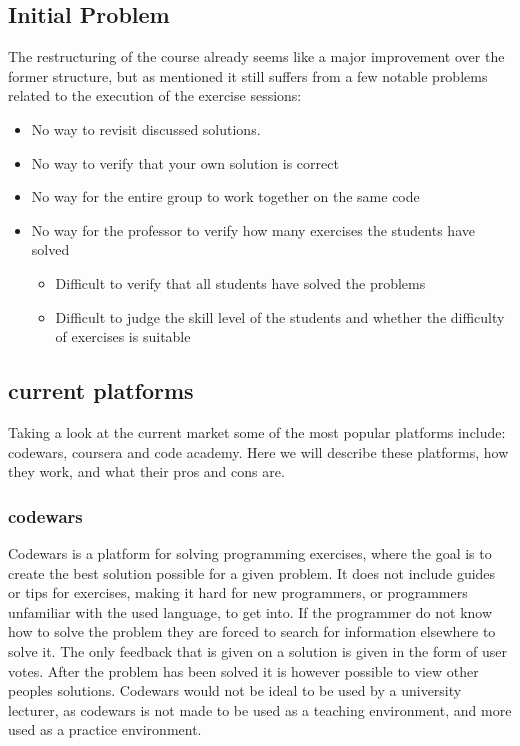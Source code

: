 \subsection{Initial Problem} \label{sec:initial-problem}
The restructuring of the course already seems like a major improvement over the former structure, but as mentioned it still suffers from a few notable problems related to the execution of the exercise sessions:
\begin{itemize}
	\item No way to revisit discussed solutions.
	\item No way to verify that your own solution is correct
	\item No way for the entire group to work together on the same code
	\item No way for the professor to verify how many exercises the students have solved
	\begin{itemize}
		\item Difficult to verify that all students have solved the problems
		\item Difficult to judge the skill level of the students and whether the difficulty of exercises is suitable
	\end{itemize}
\end{itemize}

\subsection{current platforms}
Taking a look at the current market some of the most popular platforms include: codewars, coursera and code academy.
Here we will describe these platforms, how they work, and what their pros and cons are.

\subsubsection*{codewars}
Codewars is a platform for solving programming exercises, where the goal is to create the best solution possible for a given problem. It does not include guides or tips for exercises, making it hard for new programmers, or programmers unfamiliar with the used language, to get into. If the programmer do not know how to solve the problem they are forced to search for information elsewhere to solve it. The only feedback that is given on a solution is given in the form of user votes. After the problem has been solved it is however possible to view other peoples solutions. 
Codewars would not be ideal to be used by a university lecturer, as codewars is not made to be used as a teaching environment, and more used as a practice environment.

